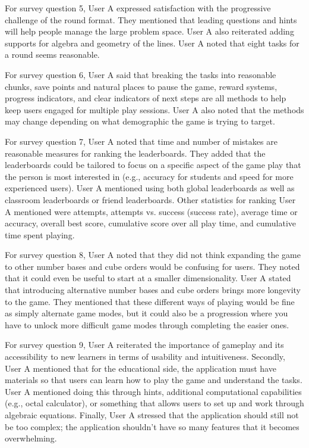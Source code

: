 \documentclass{article}
\begin{document}
For survey question 5, User A expressed satisfaction with the progressive challenge of the round format. They mentioned that leading questions and hints will help people manage the large problem space. User A also reiterated adding supports for algebra and geometry of the lines. User A noted that eight tasks for a round seems reasonable.

For survey question 6, User A said that breaking the tasks into reasonable chunks, save points and natural places to pause the game, reward systems, progress indicators, and clear indicators of next steps are all methods to help keep users engaged for multiple play sessions. User A also noted that the methods may change depending on what demographic the game is trying to target.

For survey question 7, User A noted that time and number of mistakes are reasonable measures for ranking the leaderboards. They added that the leaderboards could be tailored to focus on a specific aspect of the game play that the person is most interested in (e.g., accuracy for students and speed for more experienced users). User A mentioned using both global leaderboards as well as classroom leaderboards or friend leaderboards. Other statistics for ranking User A mentioned were attempts, attempts vs. success (success rate), average time or accuracy, overall best score, cumulative score over all play time, and cumulative time spent playing.

For survey question 8, User A noted that they did not think expanding the game to other number bases and cube orders would be confusing for users. They noted that it could even be useful to start at a smaller dimensionality. User A stated that introducing alternative number bases and cube orders brings more longevity to the game. They mentioned that these different ways of playing would be fine as simply alternate game modes, but it could also be a progression where you have to unlock more difficult game modes through completing the easier ones.

For survey question 9, User A reiterated the importance of gameplay and its accessibility to new learners in terms of usability and intuitiveness. Secondly, User A mentioned that for the educational side, the application must have materials so that users can learn how to play the game and understand the tasks. User A mentioned doing this through hints, additional computational capabilities (e.g., octal calculator), or something that allows users to set up and work through algebraic equations. Finally, User A stressed that the application should still not be too complex; the application shouldn't have so many features that it becomes overwhelming.
\end{document}
